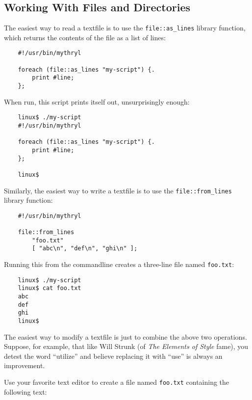 \cutend*


\subsection{Working With Files and Directories}

The easiest way to read a textfile is to use the {\tt file::as\_lines} 
library function, which returns the contents of the file as a list 
of lines:

\begin{verbatim}
    #!/usr/bin/mythryl

    foreach (file::as_lines "my-script") {.
        print #line;
    };
\end{verbatim}

When run, this script prints itself out, unsurprisingly enough:

\begin{verbatim}
    linux$ ./my-script
    #!/usr/bin/mythryl

    foreach (file::as_lines "my-script") {.
        print #line;
    };

    linux$
\end{verbatim}

Similarly, the easiest way to write a textfile is to use the 
{\tt file::from\_lines} library function:

\begin{verbatim}
    #!/usr/bin/mythryl

    file::from_lines
        "foo.txt"
        [ "abc\n", "def\n", "ghi\n" ];
\end{verbatim}

Running this from the commandline creates a three-line 
file named {\tt foo.txt}:

\begin{verbatim}
    linux$ ./my-script
    linux$ cat foo.txt
    abc
    def
    ghi
    linux$
\end{verbatim}

The easiest way to modify a textfile is just to combine 
the above two operations.  Suppose, for example, that like 
Will Strunk (of {\it The Elements of Style} fame), you 
detest the word ``utilize'' and believe replacing it with 
``use'' is always an improvement.

Use your favorite text editor to create a file named {\tt foo.txt} 
containing the following text:


